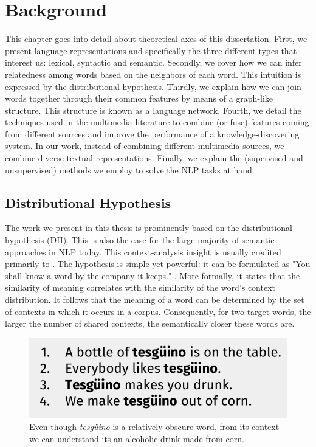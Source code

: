 \chapter{Background}
\label{chap:backgnd}
\begin{abstractchap}
This chapter goes into detail about theoretical axes of this dissertation. First, we present language representations and specifically the three different types that interest us: lexical, syntactic and semantic. Secondly, we cover how we can infer relatedness among words based on the neighbors of each word. This intuition is expressed by the distributional hypothesis. Thirdly, we explain how  we can join words together through their common features by means of a graph-like structure. This structure is known as a language network. Fourth, we detail the techniques used in the multimedia literature to combine (or fuse) features coming from different sources and improve the performance of a knowledge-discovering system. In our work, instead of combining different multimedia sources, we combine diverse textual representations. Finally, we explain the (supervised and unsupervised) methods we employ to solve the NLP tasks at hand.
\end{abstractchap}
\minitoc

\section{Distributional Hypothesis}
The work we present in this thesis is prominently based on the distributional hypothesis (DH). This is also the case for the large majority of semantic approaches in NLP today. This context-analysis insight is usually credited primarily to \cite{harris1954}. The hypothesis is simple yet powerful: it can be formulated as "You shall know a word by the company it keeps." \cite{firth57synopsis}. More formally, it states that the similarity of meaning correlates with the similarity of the word's context distribution. It follows that the meaning of a word can be determined by the set of contexts in which it occurs in a corpus. Consequently, for two target words, the larger the number of shared contexts, the semantically closer these words are. 

\begin{figure}
\centering
\includegraphics[width=.6\linewidth]{images/Chapitre2/tejuino.pdf}
\caption{Even though \textit{tesg\"{u}ino} is a relatively obscure word, from its context we can understand its an alcoholic drink made from corn.}
\label{fig:tejuino}
\end{figure}


